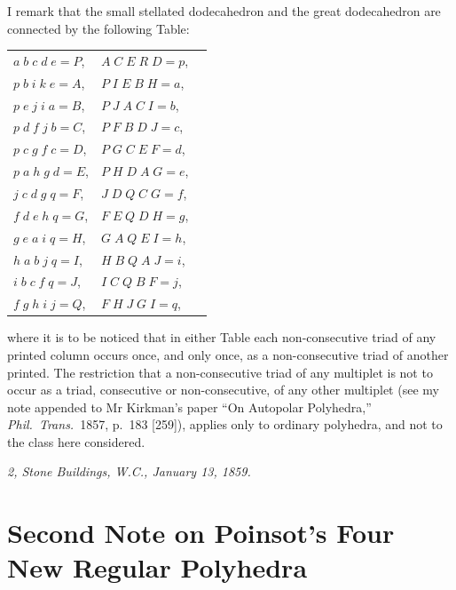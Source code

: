 \documentclass[11pt,a4paper]{article}
\begin{document}
I remark that the small stellated dodecahedron and the great dodecahedron are connected by the following Table:

\begin{center}
\begin{tabular}{lll}
$a\;b\;c\;d\;e=P$, & $A\;C\;E\;R\;D=p$, \\
$p\;b\;i\;k\;e=A$, & $P\;I\;E\;B\;H=a$, \\
$p\;e\;j\;i\;a=B$, & $P\;J\;A\;C\;I=b$, \\
$p\;d\;f\;j\;b=C$, & $P\;F\;B\;D\;J=c$, \\
$p\;c\;g\;f\;c=D$, & $P\;G\;C\;E\;F=d$, \\
$p\;a\;h\;g\;d=E$, & $P\;H\;D\;A\;G=e$, \\
$j\;c\;d\;g\;q=F$, & $J\;D\;Q\;C\;G=f$, \\
$f\;d\;e\;h\;q=G$, & $F\;E\;Q\;D\;H=g$, \\
$g\;e\;a\;i\;q=H$, & $G\;A\;Q\;E\;I=h$, \\
$h\;a\;b\;j\;q=I$, & $H\;B\;Q\;A\;J=i$, \\
$i\;b\;c\;f\;q=J$, & $I\;C\;Q\;B\;F=j$, \\
$f\;g\;h\;i\;j=Q$, & $F\;H\;J\;G\;I=q$,
\end{tabular}
\end{center}
where it is to be noticed that in either Table each non-consecutive triad of any printed column occurs once, and only once, as a non-consecutive triad of another printed. The restriction that a non-consecutive triad of any multiplet is not to occur as a triad, consecutive or non-consecutive, of any other multiplet (see my note appended to Mr Kirkman's paper ``On Autopolar Polyhedra,'' \textit{Phil.\ Trans.}\ 1857, p.~183 [259]), applies only to ordinary polyhedra, and not to the class here considered.

\medskip
\noindent\textit{2, Stone Buildings, W.C., January 13, 1859.}

\newpage


\section{Second Note on Poinsot's Four New Regular Polyhedra}
\label{paper:242}
\end{document}
